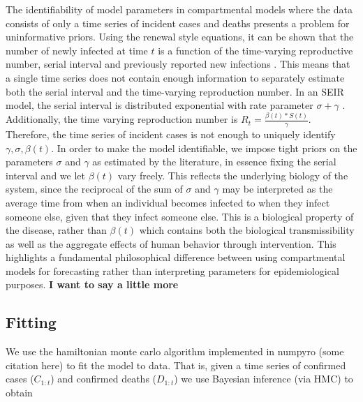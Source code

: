 \documentclass[11pt]{amsart}
\begin{document}
The identifiability of model parameters in compartmental models where the data consists of only a time series of incident cases and deaths presents a problem for uninformative priors. Using the renewal style equations, it can be shown that the number of newly infected at time $t$ is a function of the time-varying reproductive number, serial interval and previously reported new infections \cite{wallinga2007generation}. This means that a single time series does not contain enough information to separately estimate both the serial interval and the time-varying reproduction number. In an SEIR model, the serial interval is distributed exponential with rate parameter $\sigma + \gamma$ \cite{wallinga2007generation}. Additionally, the time varying reproduction number is $R_t = \frac{\beta(t)*S(t)}{\gamma}$. Therefore, the time series of incident cases is not enough to uniquely identify $\gamma,\sigma,\beta(t)$. In order to make the model identifiable, we impose tight priors on the parameters $\sigma$ and $\gamma$ as estimated by the literature, in essence fixing the serial interval and we let $\beta(t)$ vary freely. This reflects the underlying biology of the system, since the reciprocal of the sum of $\sigma$ and $\gamma$ may be interpreted as the average time from when an individual becomes infected to when they infect someone else, given that they infect someone else. This is a biological property of the disease, rather than $\beta(t)$ which contains both the biological transmissibility as well as the aggregate effects of human behavior through intervention. This highlights a fundamental philosophical difference between using compartmental models for forecasting rather than interpreting parameters for epidemiological purposes. \textbf{I want to say a little more} 

%  
  \subsection{Fitting}
We use the hamiltonian monte carlo algorithm implemented in numpyro (some citation here) to fit the model to data. That is, given a time series of confirmed cases ($C_{1:t}$) and confirmed deaths ($D_{1:t}$) we use Bayesian inference (via HMC) to obtain 
\end{document}
